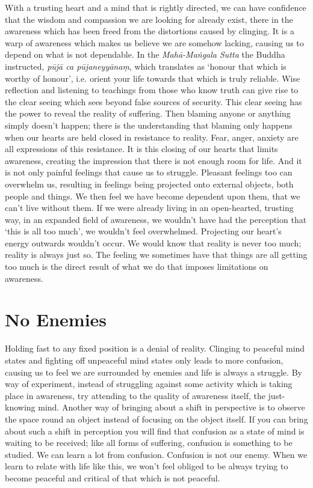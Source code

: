 With a trusting heart and a mind that is rightly directed, we can have
confidence that the wisdom and compassion we are looking for already
exist, there in the awareness which has been freed from the distortions
caused by clinging. It is a warp of awareness which makes us believe we
are somehow lacking, causing us to depend on what is not dependable. In
the \emph{Mahā-Maṅgala Sutta}\cite{mahamangala-sutta}
the Buddha instructed, \emph{pūjā ca pūjaneyyānaṃ},
which translates as ‘honour that which is worthy of
honour’, i.e. orient your life towards that which is truly reliable.
Wise reflection and listening to teachings from those who know truth can
give rise to the clear seeing which sees beyond false sources of
security. This clear seeing has the power to reveal the reality of
suffering. Then blaming anyone or anything simply doesn’t happen; there
is the understanding that blaming only happens when our hearts are held
closed in resistance to reality. Fear, anger, anxiety are all
expressions of this resistance. It is this closing of our hearts that
limits awareness, creating the impression that there is not enough room
for life. And it is not only painful feelings that cause us to struggle.
Pleasant feelings too can overwhelm us, resulting in feelings being
projected onto external objects, both people and things. We then feel we
have become dependent upon them, that we can’t live without them. If we
were already living in an open-hearted, trusting way, in an expanded
field of awareness, we wouldn’t have had the perception that ‘this is
all too much’, we wouldn’t feel overwhelmed. Projecting our heart’s
energy outwards wouldn’t occur. We would know that reality is never too
much; reality is always just so. The feeling we sometimes have that
things are all getting too much is the direct result of what we do that
imposes limitations on awareness.

\section{No Enemies}

Holding fast to any fixed position is a denial of reality. Clinging to
peaceful mind states and fighting off unpeaceful mind states only leads
to more confusion, causing us to feel we are surrounded by enemies and
life is always a struggle. By way of experiment, instead of struggling
against some activity which is taking place in awareness, try attending
to the quality of awareness itself, the just-knowing mind. Another way
of bringing about a shift in perspective is to observe the space round
an object instead of focusing on the object itself. If you can bring
about such a shift in perception you will find that confusion as a state
of mind is waiting to be received; like all forms of suffering,
confusion is something to be studied. We can learn a lot from confusion.
Confusion is not our enemy. When we learn to relate with life like this,
we won’t feel obliged to be always trying to become peaceful and
critical of that which is not peaceful.

